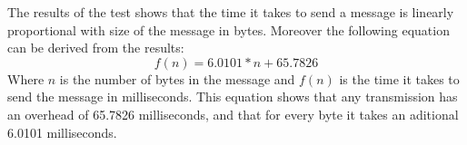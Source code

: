 The results of the test shows that the time it takes to send a message is linearly proportional with size of the message in bytes.
Moreover the following equation can be derived from the results:
\begin{equation}\label{eq:timeToSendFormular}
f(n)=6.0101 * n + 65.7826
\end{equation}
Where $n$ is the number of bytes in the message and $f(n)$ is the time it takes to send the message in milliseconds.
This equation shows that any transmission has an overhead of 65.7826 milliseconds, and that for every byte it takes an aditional 6.0101 milliseconds.    

